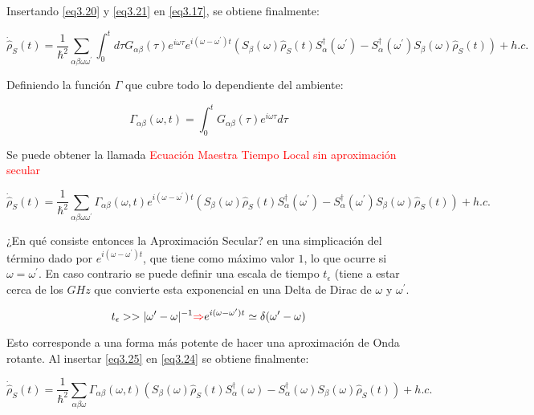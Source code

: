 \documentclass{book}
\begin{document}
Insertando \ref{eq3.20} y \ref{eq3.21} en \ref{eq3.17}, se obtiene finalmente:

\begin{equation}\label{eq3.22}\dot{\hat{\rho}}_S(t)=\frac{1}{\hslash^2}\sum_{\alpha\beta\omega\omega^\prime}\int_0^t d\tau G_{\alpha\beta}(\tau)e^{i\omega\tau}e^{i(\omega-\omega^\prime) t}(S_\beta(\omega)\hat{\rho}_S(t)S_\alpha^\dag(\omega^\prime)-S^\dag_\alpha(\omega^\prime) S_\beta(\omega)\hat{\rho}_S(t))+h.c.\end{equation}

Definiendo la función $\Gamma$ que cubre todo lo dependiente del ambiente:

\begin{equation}\label{eq3.23}\Gamma_{\alpha\beta}(\omega,t)=\int_0^t G_{\alpha\beta}(\tau)e^{i\omega\tau}d\tau \end{equation}

Se puede obtener la llamada \textcolor{red}{Ecuación Maestra Tiempo Local sin aproximación secular}

\begin{equation}\label{eq3.24}\dot{\hat{\rho}}_S(t)=\frac{1}{\hslash^2}\sum_{\alpha\beta\omega\omega^\prime} \Gamma_{\alpha\beta}(\omega, t)e^{i(\omega-\omega^\prime) t}(S_\beta(\omega)\hat{\rho}_S(t)S_\alpha^\dag(\omega^\prime)-S^\dag_\alpha(\omega^\prime) S_\beta(\omega)\hat{\rho}_S(t))+h.c.\end{equation}

¿En qué consiste entonces la Aproximación Secular? en una simplicación del término dado por $e^{i(\omega-\omega^\prime)t}$, que tiene como máximo valor $1$, lo que ocurre si $\omega=\omega^\prime$. En caso contrario se puede definir una escala de tiempo $t_\epsilon$ (tiene a estar cerca de los $GHz$ que convierte esta exponencial en una Delta de Dirac de $\omega$ y $\omega^\prime$.

\begin{equation}\label{eq3.25} t_\epsilon >> \lvert \omega^\prime-\omega\rvert^{-1} \textcolor{red}{\Rightarrow} e^{i(\omega-\omega^\prime)t} \simeq \delta(\omega^\prime-\omega) \end{equation}

Esto corresponde a una forma más potente de hacer una aproximación de Onda rotante. Al insertar \ref{eq3.25} en \ref{eq3.24} se obtiene finalmente:

\begin{equation}\label{eq3.26}\dot{\hat{\rho}}_S(t)=\frac{1}{\hslash^2}\sum_{\alpha\beta\omega} \Gamma_{\alpha\beta}(\omega, t)(S_\beta(\omega)\hat{\rho}_S(t)S_\alpha^\dag(\omega)-S^\dag_\alpha(\omega) S_\beta(\omega)\hat{\rho}_S(t))+h.c.\end{equation}
\end{document}
